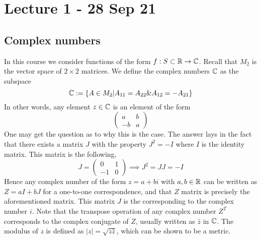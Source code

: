 \section{Lecture 1 - 28 Sep 21}
\subsection{Complex numbers}
In this course we consider functions of the form $f:S\subset\mathbb R\to\mathbb C$. Recall that $M_2$
is the vector space of $2\times 2$ matrices. We define the complex numbers $\mathbb C$ as the
subspace 
\[\mathbb C := \left\{  A\in M_2 | A_{11} =A_{22} \& A_{12}=-A_{21} \right\}\]
In other words, any element $z\in\mathbb C$ is an element of the form
\[
\begin{pmatrix}
  a & b \\
  -b & a
\end{pmatrix}
\]
One may get the question as to why this is the case. The answer lays in the fact that
there exists a matrix $J$ with the property $J^2=-I$ where $I$ is the identity matrix.
This matrix is the following,
\[
J = \begin{pmatrix}
  0 & 1 \\
  -1 & 0
\end{pmatrix} \implies J^2 = JJ= -I
\]
Hence any complex number of the form $z=a+bi$ with $a,b\in\mathbb R$ can be written as $Z=
aI+bJ$ for a one-to-one correspondence, and that $Z$ matrix is precisely the
aforementioned matrix. This matrix $J$ is the corresponding to the complex number $i$.
Note that the transpose operation of any complex number $Z^T$ corresponds to the complex
conjugate of $Z$, usually written as $\bar{z}$ in $\mathbb C$.
The modulus of $z$ is defined as $|z|=\sqrt{z\bar{z}}$, which can be shown to be a metric.

